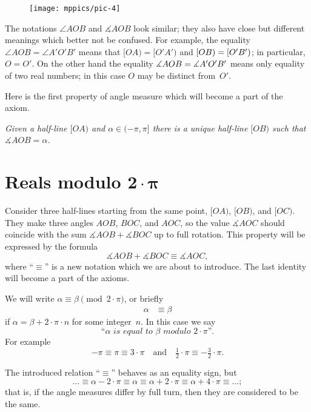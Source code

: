 \begin{wrapfigure}{o}{25mm}
\vskip-0mm
\centering
\texttt{[image: mppics/pic-4]}
\end{wrapfigure}

The notations $\angle AOB$ and $\measuredangle AOB$ look similar;
they also have close but different meanings which better not be confused.
For example, the equality 
$\angle AOB=\angle A'O'B'$
means that
$[OA)=[O'A')$ and $[OB)\z=[O'B')$;
in particular, $O=O'$.
On the other hand the equality 
$\measuredangle AOB\z=\measuredangle A'O'B'$ 
means only equality of two real numbers;
in this case $O$ may be distinct from~$O'$.

Here is the first property of angle measure which will become a part of the axiom.

\textit{Given a half-line $[O A)$ and $\alpha\in(-\pi,\pi]$ there is a unique half-line $[O B)$ such that $\measuredangle A O B= \alpha$.}





\section*{Reals modulo $\bm{2\cdot\pi}$}



Consider three half-lines starting from the same point, $[O A)$, $[O B)$, and $[O C)$.
They make three angles $A O B$, $B O C$, and $A O C$,
so the value $\measuredangle A O C$ should coincide with
the sum $\measuredangle A O B+\measuredangle B O C$ up to full rotation.
This property will be expressed by the formula 
$$\measuredangle A O B+\measuredangle B O C\equiv \measuredangle A O C,$$
where ``$\equiv$'' is a new notation which we are about to introduce.
The last identity will become a part of the axioms.

We will write $\alpha\equiv\beta\pmod{2\cdot\pi}$, or briefly
\begin{align*}
\alpha&\equiv\beta
\end{align*}
if $\alpha=\beta+2\cdot\pi\cdot n$
for some integer~$n$.
In this case we say 
$$\textit{``$\alpha$ is equal to $\beta$ modulo $2\cdot\pi$''}.$$
For example 
$$-\pi
\equiv
\pi\equiv 3\cdot\pi
\quad
\text{and}
\quad
\tfrac12\cdot\pi
\equiv
-\tfrac32\cdot\pi.$$

The introduced relation ``$\equiv$'' behaves as an equality sign,
but
\[\dots\equiv\alpha-2\cdot\pi\equiv \alpha\equiv \alpha+2\cdot\pi\equiv \alpha+4\cdot\pi\equiv\dots;\] 
that is, if the angle measures differ by full turn,
then they are considered to be the same.

